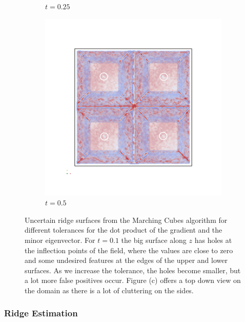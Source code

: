 \begin{figure}
\begin{subfigure}[]{0.49\textwidth}
        \caption{$t=0.25$}
        \label{fig:MCridgetol}
    \end{subfigure}
    \begin{subfigure}[]{0.49\textwidth}
        \includegraphics[width=\textwidth]{Images/MCridgetoltop.png}
        \caption{$t=0.5$}
        \label{fig:MCridgetop}
    \end{subfigure}
    \caption{Uncertain ridge surfaces from the Marching Cubes algorithm
    for different tolerances for the dot product of the gradient and the
    minor eigenvector. For $t=0.1$ the big surface along $z$ has holes
    at the inflection points of the field, where the values are close to
    zero and some undesired features at the edges of the upper and lower
    surfaces. As we increase the tolerance, the holes become smaller,
    but a lot more false positives occur. Figure (c) offers a top down
    view on the domain as there is a lot of cluttering on the sides.}
    \label{fig:MCridges}
\end{figure}

\subsubsection{Ridge Estimation}

